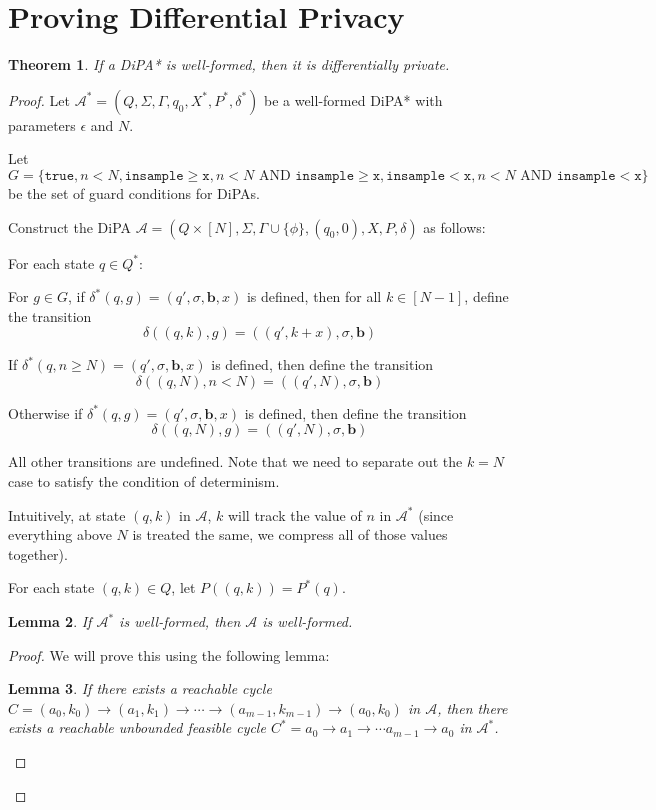 \documentclass[12pt]{article}
\newcommand{\gguard}{\texttt{insample}\geq \texttt{x}}
\newcommand{\lguard}{\texttt{insample} < \texttt{x}}
\newcommand{\gaguard}{n<N \text{ AND } \texttt{insample} \geq \texttt{x}}
\newcommand{\laguard}{n<N\text{ AND }\texttt{insample} < \texttt{x}}
\newtheorem{thm}{Theorem}[section]
\newtheorem{lemma}[thm]{Lemma}
\theoremstyle{definition}
\begin{document}
\section{Proving Differential Privacy}

\begin{thm} 
	If a DiPA* is well-formed, then it is differentially private.
\end{thm}

\begin{proof}



Let $\mathcal{A}^* = (Q, \Sigma, \Gamma, q_0, X^*, P^*, \delta^*)$ be a well-formed DiPA* with parameters $\epsilon$ and $N$. 

Let $G = \{\texttt{true}, n<N, \gguard, \gaguard, \lguard,\laguard \}$ be the set of guard conditions for DiPAs.

Construct the DiPA $\mathcal{A} = (Q \times [N], \Sigma, \Gamma\cup \{\phi\}, (q_0, 0), X, P, \delta)$ as follows:



For each state $q \in Q^*$:

For $g\in G$, if $\delta^*(q, g) = (q', \sigma, \mathbf{b}, x)$ is defined, then for all $k \in [N-1]$, define the transition
\[
	\delta((q, k), g) = ((q', k+x), \sigma, \mathbf{b})	
\]

If $\delta^*(q, n\geq N) = (q', \sigma, \mathbf{b}, x)$ is defined, then define the transition \[
	\delta((q, N), n<N) = ((q', N), \sigma, \mathbf{b})
\]

Otherwise if $\delta^*(q, g) = (q', \sigma, \mathbf{b}, x)$ is defined, then define the transition
\[
	\delta((q, N), g) = ((q', N), \sigma, \mathbf{b})
\]

All other transitions are undefined. Note that we need to separate out the $k = N$ case to satisfy the condition of determinism.

Intuitively, at state $(q, k)$ in $\mathcal{A}$, $k$ will track the value of $n$ in $\mathcal{A}^*$ (since everything above $N$ is treated the same, we compress all of those values together).

For each state $(q, k)\in Q$, let $P((q, k)) = P^*(q)$.


\begin{lemma}
	If $\mathcal{A}^*$ is well-formed, then $\mathcal{A}$ is well-formed.	
\end{lemma}

\begin{proof}
	We will prove this using the following lemma: 
	\begin{lemma}
		If there exists a reachable cycle $C = (a_0, k_0)\to (a_1, k_1)\to \cdots \to (a_{m-1}, k_{m-1})\to (a_0, k_0)$ in $\mathcal{A}$, then there exists a reachable unbounded feasible cycle $C^* = a_0\to a_1\to \cdots a_{m-1}\to a_0$ in $\mathcal{A}^*$.
	\end{lemma}


\end{proof}
\end{proof}
\end{document}
